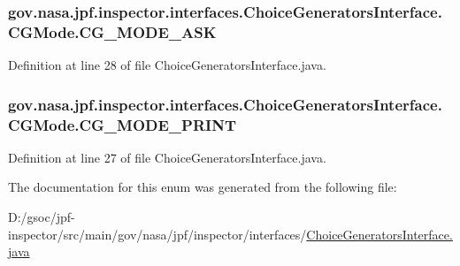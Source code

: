 \subsubsection[{\texorpdfstring{C\+G\+\_\+\+M\+O\+D\+E\+\_\+\+A\+SK}{CG_MODE_ASK}}]{\setlength{\rightskip}{0pt plus 5cm}gov.\+nasa.\+jpf.\+inspector.\+interfaces.\+Choice\+Generators\+Interface.\+C\+G\+Mode.\+C\+G\+\_\+\+M\+O\+D\+E\+\_\+\+A\+SK}\hypertarget{enumgov_1_1nasa_1_1jpf_1_1inspector_1_1interfaces_1_1_choice_generators_interface_1_1_c_g_mode_aa81956eaa60ff2722dbaa12f1a1b89bd}{}\label{enumgov_1_1nasa_1_1jpf_1_1inspector_1_1interfaces_1_1_choice_generators_interface_1_1_c_g_mode_aa81956eaa60ff2722dbaa12f1a1b89bd}


Definition at line 28 of file Choice\+Generators\+Interface.\+java.

\subsubsection[{\texorpdfstring{C\+G\+\_\+\+M\+O\+D\+E\+\_\+\+P\+R\+I\+NT}{CG_MODE_PRINT}}]{\setlength{\rightskip}{0pt plus 5cm}gov.\+nasa.\+jpf.\+inspector.\+interfaces.\+Choice\+Generators\+Interface.\+C\+G\+Mode.\+C\+G\+\_\+\+M\+O\+D\+E\+\_\+\+P\+R\+I\+NT}\hypertarget{enumgov_1_1nasa_1_1jpf_1_1inspector_1_1interfaces_1_1_choice_generators_interface_1_1_c_g_mode_aa57768ae6f1c100e6b2acbf7abe3aa7d}{}\label{enumgov_1_1nasa_1_1jpf_1_1inspector_1_1interfaces_1_1_choice_generators_interface_1_1_c_g_mode_aa57768ae6f1c100e6b2acbf7abe3aa7d}


Definition at line 27 of file Choice\+Generators\+Interface.\+java.



The documentation for this enum was generated from the following file\+:\begin{DoxyCompactItemize}
\item 
D\+:/gsoc/jpf-\/inspector/src/main/gov/nasa/jpf/inspector/interfaces/\hyperlink{_choice_generators_interface_8java}{Choice\+Generators\+Interface.\+java}\end{DoxyCompactItemize}
